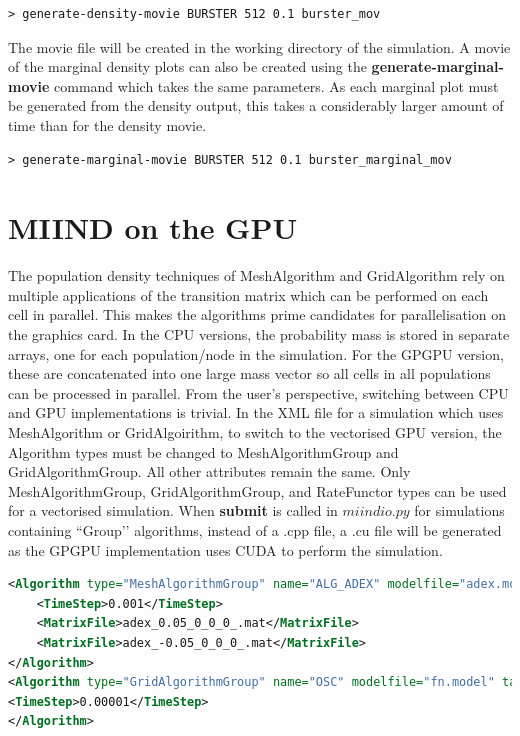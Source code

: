 \documentclass[utf8]{frontiersSCNS} %
\begin{document}
\begin{lstlisting}[language=xml]
> generate-density-movie BURSTER 512 0.1 burster_mov
\end{lstlisting}

The movie file will be created in the working directory of the simulation. A movie of the marginal density plots can also be created using the \textbf{generate-marginal-movie} command which takes the same parameters. As each marginal plot must be generated from the density output, this takes a considerably larger amount of time than for the density movie.

\begin{lstlisting}[language=xml]
> generate-marginal-movie BURSTER 512 0.1 burster_marginal_mov
\end{lstlisting}

\section{MIIND on the GPU}
The population density techniques of MeshAlgorithm and GridAlgorithm rely on multiple applications of the transition matrix which can be performed on each cell in parallel. This makes the algorithms prime candidates for parallelisation on the graphics card. In the CPU versions, the probability mass is stored in separate arrays, one for each population/node in the simulation. For the GPGPU version, these are concatenated into one large mass vector so all cells in all populations can be processed in parallel. From the user’s perspective, switching between CPU and GPU implementations is trivial. In the XML file for a simulation which uses MeshAlgorithm or GridAlgoirithm, to switch to the vectorised GPU version, the Algorithm types must be changed to MeshAlgorithmGroup and GridAlgorithmGroup. All other attributes remain the same. Only MeshAlgorithmGroup, GridAlgorithmGroup, and RateFunctor types can be used for a vectorised simulation. When \textbf{submit} is called in $miindio.py$ for simulations containing ``Group’’ algorithms, instead of a .cpp file, a .cu file will be generated as the GPGPU implementation uses CUDA to perform the simulation. 

\begin{lstlisting}[language=xml]
<Algorithm type="MeshAlgorithmGroup" name="ALG_ADEX" modelfile="adex.model" >
	<TimeStep>0.001</TimeStep>
	<MatrixFile>adex_0.05_0_0_0_.mat</MatrixFile>
	<MatrixFile>adex_-0.05_0_0_0_.mat</MatrixFile>
</Algorithm>
<Algorithm type="GridAlgorithmGroup" name="OSC" modelfile="fn.model" tau_refractive="0.0" transformfile="fn_0_0_0_0_.tmat" start_v="-1.0" start_w="-0.3" ratemethod="AvgV">
<TimeStep>0.00001</TimeStep>
</Algorithm>
\end{lstlisting}
\end{document}
